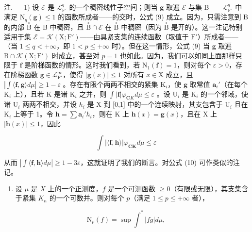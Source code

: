 注. --- 1) 设 \(\mathcal{E}\) 是 \(\mathcal{L}_{\mathrm{F}'}^q\) 的一个稠密线性子空间；则当 \(\mathbf{g}\) 取遍 \(\mathcal{E}\) 与集 B——\(\mathcal{L}_{\mathrm{F}'}^q\) 中满足 \(\mathrm{N}_q(\mathbf{g}) \leqslant 1\) 的函数所成者——的交时，公式 (9) 成立。因为，只需注意到 B 的内部 \(\overset{\circ}{\mathrm{B}}\) 在 B 中稠密，且 \(\overset{\circ}{\mathrm{B}} \cap \mathcal{E}\) 在 \(\overset{\circ}{\mathrm{B}}\) 中稠密（因为 \(\overset{\circ}{\mathrm{B}}\) 是开的）。这一注记特别适用于集 \(\mathcal{E} = \mathcal{K}(\mathrm{X};\mathrm{F}')\)——由具紧支集的连续函数（取值于 \(\mathrm{F}'\)）所成者——（当 \(1 \leqslant q < +\infty\)，即 \(1 < p \leqslant +\infty\) 时）。但在这一情形，公式 (9) 当 \(\mathbf{g}\) 取遍 \(\mathrm{B} \cap \mathcal{K}(\mathrm{X};\mathrm{F}')\) 时成立，甚至对 \(p = 1\) 也如此。因为，我们可以如同上面那样只限于 \(\mathbf{f}\) 是阶梯函数的情形。这时我们看到，若 \(\mathrm{N}_1(\mathbf{f}) = 1\)，则对每个 \(\varepsilon > 0\)，存在阶梯函数 \(\mathbf{g} \in \mathcal{L}_{\mathrm{F}'}^{\infty}\)，使得 \(|\mathbf{g}(x)| \leqslant 1\) 对所有 \(x \in \mathrm{X}\) 成立，且 \(|\int \langle \mathbf{f},\mathbf{g}\rangle d\mu| \geqslant 1 - \varepsilon\) 。存在有限个两两不相交的紧集 \(\mathrm{K}_i\)，使 \(\mathbf{g}\) 取常值 \(\mathbf{a}_i'\)（在每个 \(\mathrm{K}_i\) 上），且若 K 是诸 \(\mathrm{K}_i\) 之并，则 \(\int |\mathbf{f}| \varphi_{\mathbf{C} K} d\mu \leqslant \varepsilon\) 。设 \(\mathrm{U}_i\) 是 \(\mathrm{K}_i\) 的一个邻域，使诸 \(\mathrm{U}_i\) 两两不相交，并设 \(h_i\) 是 X 到 {[}0,1{]} 中的一个连续映射，其支包含于 \(\mathrm{U}_i\) 且在 \(\mathrm{K}_i\) 上等于 1。令 \(\mathbf{h} = \sum \mathbf{a}_i' h_i\)，则在 K 上 \(\mathbf{h}(x) = \mathbf{g}(x)\)，且在 X 上 \(|\mathbf{h}(x)| \leqslant 1\)，因此

\[
\int | \langle \mathbf {f}, \mathbf {h} \rangle | \varphi_ {\mathbf {C K}} d \mu \leqslant \varepsilon
\]

从而 \(|\int \langle \mathbf{f},\mathbf{h}\rangle d\mu |\geqslant 1 - 3\varepsilon\)，这就证明了我们的断言。对公式 (10) 可作类似的注记。

\begin{enumerate}
\def\labelenumi{\arabic{enumi})}
\setcounter{enumi}{1}
\tightlist
\item
  设 \(\mu\) 是 \(X\) 上的一个正测度，\(f\) 是一个可测函数 \(\geqslant 0\)（有限或无限），其支集含于紧集 \(K_{n}\) 的一个可数并。则对每个 \(p\)（满足 \(1 \leqslant p \leqslant +\infty\) 者），
\end{enumerate}

\[
\mathrm{N} _ {p} (f) = \sup \int^ {*} | f g | d \mu ,\tag{11}
\]

